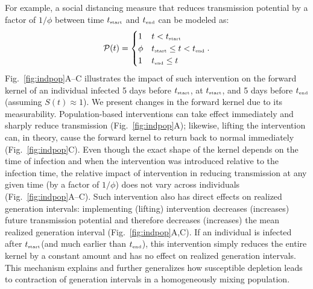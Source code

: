 \documentclass[12pt]{article}
\newcommand{\fref}[1]{Fig.~\ref{fig:#1}}
\newcommand{\tsub}[2]{#1_{{\textrm{\tiny #2}}}}
\newcommand{\tstart}{\ensuremath{\tsub{t}{start}}\xspace}
\newcommand{\tend}{\ensuremath{\tsub{t}{end}}\xspace}
\newcommand{\PP}{{\mathcal P}}
\begin{document}
For example, a social distancing measure that reduces transmission potential by a factor of $1/\phi$ between time \tstart and \tend can be modeled as:
\begin{equation}
\PP(t) = \begin{cases}
1 & t < \tstart\\
\phi & \tstart \leq t < \tend\\
1 & \tend \leq t
\end{cases}.
\end{equation}
\fref{indpop}A--C illustrates the impact of such intervention on the forward kernel of an individual infected 5 days before $\tstart$, at $\tstart$, and 5 days before $\tend$ (assuming $S(t) \approx 1$).
We present changes in the forward kernel due to its measurability.
Population-based interventions can take effect immediately and sharply reduce transmission (\fref{indpop}A);
likewise, lifting the intervention can, in theory, cause the forward kernel to return back to normal immediately (\fref{indpop}C).
Even though the exact shape of the kernel depends on the time of infection and when the intervention was introduced relative to the infection time, the relative impact of intervention in reducing transmission at any given time (by a factor of $1/\phi$) does not vary across individuals (\fref{indpop}A--C).
Such intervention also has direct effects on realized generation intervals:
implementing (lifting) intervention decreases (increases) future transmission potential and therefore decreases (increases) the mean realized generation interval (\fref{indpop}A,C).
If an individual is infected after \tstart (and much earlier than \tend), this intervention simply reduces the entire kernel by a constant amount and has no effect on realized generation intervals.
This mechanism explains and further generalizes how susceptible depletion leads to contraction of generation intervals in a homogeneously mixing population. 
\end{document}

